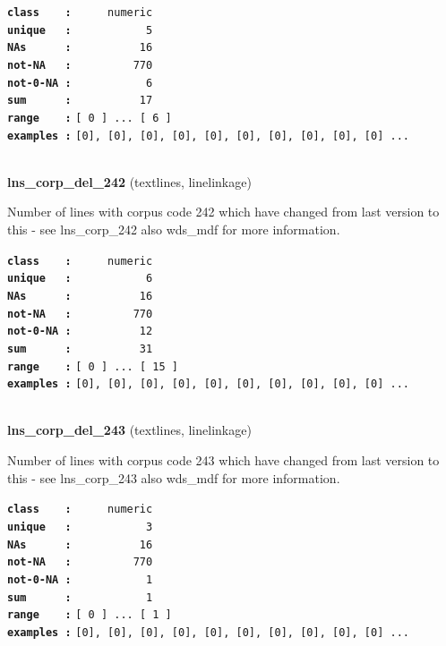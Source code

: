 \documentclass[]{article}
\begin{document}
\textbf{\texttt{class\ \ \ \ :}} \texttt{~~~~~numeric}\\
\textbf{\texttt{unique\ \ \ :}} \texttt{~~~~~~~~~~~5}\\
\textbf{\texttt{NAs\ \ \ \ \ \ :}} \texttt{~~~~~~~~~~16}\\
\textbf{\texttt{not-NA\ \ \ :}} \texttt{~~~~~~~~~770}\\
\textbf{\texttt{not-0-NA\ :}} \texttt{~~~~~~~~~~~6}\\
\textbf{\texttt{sum\ \ \ \ \ \ :}} \texttt{~~~~~~~~~~17}\\
\textbf{\texttt{range\ \ \ \ :}}
\texttt{{[}\ 0\ {]}\ ...\ {[}\ 6\ {]}}\\
\textbf{\texttt{examples\ :}}
\texttt{{[}0{]},\ {[}0{]},\ {[}0{]},\ {[}0{]},\ {[}0{]},\ {[}0{]},\ {[}0{]},\ {[}0{]},\ {[}0{]},\ {[}0{]}\ ...}\\

~

\textbf{lns\_corp\_del\_242} (textlines, linelinkage)

Number of lines with corpus code 242 which have changed from last
version to this - see lns\_corp\_242 also wds\_mdf for more information.

\textbf{\texttt{class\ \ \ \ :}} \texttt{~~~~~numeric}\\
\textbf{\texttt{unique\ \ \ :}} \texttt{~~~~~~~~~~~6}\\
\textbf{\texttt{NAs\ \ \ \ \ \ :}} \texttt{~~~~~~~~~~16}\\
\textbf{\texttt{not-NA\ \ \ :}} \texttt{~~~~~~~~~770}\\
\textbf{\texttt{not-0-NA\ :}} \texttt{~~~~~~~~~~12}\\
\textbf{\texttt{sum\ \ \ \ \ \ :}} \texttt{~~~~~~~~~~31}\\
\textbf{\texttt{range\ \ \ \ :}}
\texttt{{[}\ 0\ {]}\ ...\ {[}\ 15\ {]}}\\
\textbf{\texttt{examples\ :}}
\texttt{{[}0{]},\ {[}0{]},\ {[}0{]},\ {[}0{]},\ {[}0{]},\ {[}0{]},\ {[}0{]},\ {[}0{]},\ {[}0{]},\ {[}0{]}\ ...}\\

~

\textbf{lns\_corp\_del\_243} (textlines, linelinkage)

Number of lines with corpus code 243 which have changed from last
version to this - see lns\_corp\_243 also wds\_mdf for more information.

\textbf{\texttt{class\ \ \ \ :}} \texttt{~~~~~numeric}\\
\textbf{\texttt{unique\ \ \ :}} \texttt{~~~~~~~~~~~3}\\
\textbf{\texttt{NAs\ \ \ \ \ \ :}} \texttt{~~~~~~~~~~16}\\
\textbf{\texttt{not-NA\ \ \ :}} \texttt{~~~~~~~~~770}\\
\textbf{\texttt{not-0-NA\ :}} \texttt{~~~~~~~~~~~1}\\
\textbf{\texttt{sum\ \ \ \ \ \ :}} \texttt{~~~~~~~~~~~1}\\
\textbf{\texttt{range\ \ \ \ :}}
\texttt{{[}\ 0\ {]}\ ...\ {[}\ 1\ {]}}\\
\textbf{\texttt{examples\ :}}
\texttt{{[}0{]},\ {[}0{]},\ {[}0{]},\ {[}0{]},\ {[}0{]},\ {[}0{]},\ {[}0{]},\ {[}0{]},\ {[}0{]},\ {[}0{]}\ ...}\\
\end{document}
